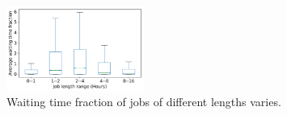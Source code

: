\begin{figure}
  \includegraphics[width=0.4\textwidth]{../graphs/waiting_time_buckets.pdf}
  \caption{Waiting time fraction of jobs of different lengths varies.}
  \label{fig:hpc-wait-buckets}  
\end{figure}



